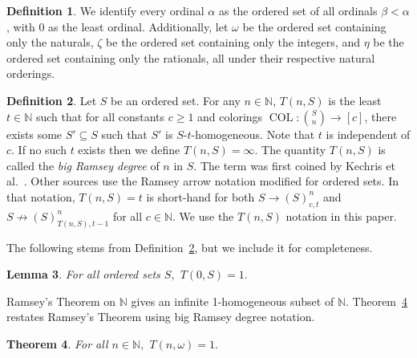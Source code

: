 \documentclass[11pt]{article}
\newcommand{\oequiv}{\approx}
\newcommand{\COL}{\operatorname{COL}}
\newcommand{\N}{\mathbb{N}}
\newcommand{\numpoints}{n}
\newcommand{\numcolors}{c}
\theoremstyle{plain}
\newtheorem{theorem}{Theorem}[section]
\newtheorem{lemma}[theorem]{Lemma}
\theoremstyle{definition}
\newtheorem{definition}[theorem]{Definition}
\begin{document}
\begin{definition}
We identify every ordinal $\alpha$ as the ordered set of all ordinals $\beta < \alpha$, with 0 as the least ordinal. Additionally, let $\omega$ be the ordered set containing only the naturals, $\zeta$ be the ordered set containing only the integers, and $\eta$ be the ordered set containing only the rationals, all under their respective natural orderings.

\end{definition}

\begin{definition}\label{def:T}
Let $S$ be an ordered set.
For any $\numpoints\in \N$, $T(\numpoints,S)$
is the least $t\in \N$ such that for all constants $\numcolors \geq 1$ and
colorings  $\COL \colon \binom{S}{\numpoints} \to [\numcolors]$, there exists some $S' \subseteq S$ 
such that $S'$ is $S$-$t$-homogeneous.
Note that $t$ is independent of $\numcolors$.
If no such $t$ exists then we define $T(\numpoints,S)=\infty$. 
The quantity $T(\numpoints,S)$ is called the \textit{big Ramsey degree} of $\numpoints$ in $S$.
The term was first coined by Kechris et al.~\cite{KPT-2005}. Other sources use the Ramsey arrow notation modified for ordered sets. In that notation, $T(\numpoints,S)=t$ is short-hand for both
$S \to (S)^{\numpoints}_{\numcolors,t}$ and $S \not \to
(S)^{\numpoints}_{T(\numpoints,S),t-1}$ for all $\numcolors \in \N.$
We use the $T(n, S)$ notation in this paper.
\end{definition}

The following stems from Definition~\ref{def:T}, but we include it for completeness.
\begin{lemma}\label{lem:choose0}
    For all ordered sets $S,$ $T(0,S) = 1.$ 
\end{lemma}

Ramsey's Theorem on $\N$ gives an infinite 1-homogeneous subset of $\N$. Theorem~\ref{th:ramsey} restates Ramsey's Theorem using big Ramsey degree notation.

\begin{theorem}\label{th:ramsey}
For all $\numpoints \in \N,$
$T(\numpoints,\omega)=1.$
\end{theorem}
\end{document}

